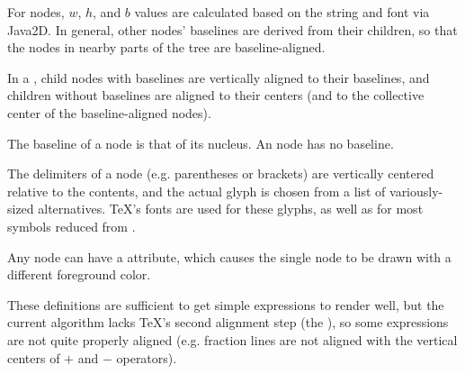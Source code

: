 For  nodes, $w$, $h$, and $b$ values are calculated based on the string and font via Java2D. In general, other nodes' baselines are derived from their children, so that the  nodes in nearby parts of the tree are baseline-aligned.

In a , child nodes with baselines are vertically aligned to their baselines, and children without baselines are aligned to their centers (and to the collective center of the baseline-aligned nodes).

The baseline of a  node is that of its nucleus. An  node has no baseline. 

The delimiters of a  node (e.g. parentheses or brackets) are vertically centered relative to the contents, and the actual glyph is chosen from a list of variously-sized alternatives. \TeX's fonts are used for these glyphs, as well as for most symbols reduced from .

Any node can have a  attribute, which causes the single node to be drawn with a different foreground color.

These definitions are sufficient to get simple expressions to render well, but the current algorithm lacks \TeX's second alignment step (the ), so some expressions are not quite properly aligned (e.g. fraction lines are not aligned with the vertical centers of $+$ and $-$ operators).



